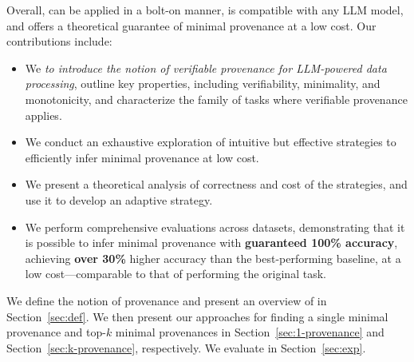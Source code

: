 Overall, \sys can be applied in a bolt-on manner, 
is compatible with any LLM model, 
and offers a theoretical guarantee 
of minimal provenance at a low cost.  Our contributions include:
\begin{itemize}[leftmargin=*]
    \item We {\em {} to introduce the notion of verifiable provenance for LLM-powered data processing}, outline key properties, including verifiability, minimality, and monotonicity, and 
    characterize the family of tasks where verifiable provenance applies.  
    \item We conduct an exhaustive exploration of intuitive  but effective strategies to efficiently infer minimal provenance at low cost.   
    \item We present a theoretical analysis of correctness and cost of the strategies, and use it to develop an adaptive strategy. 
    \item We perform comprehensive evaluations across  datasets, demonstrating that it is possible to infer minimal provenance with  {\bf guaranteed 100\% accuracy}, achieving \textbf{over 30\%} higher accuracy than the best-performing baseline, at a low cost—comparable to that of performing the original task. 
\end{itemize}
\noindent We define the notion of provenance and present an  overview of \sys in Section~\ref{sec:def}. We then present our approaches for finding a single minimal provenance and top-$k$ minimal provenances in Section~\ref{sec:1-provenance} and  Section~\ref{sec:k-provenance}, respectively. We  evaluate \sys in Section~\ref{sec:exp}. 









 